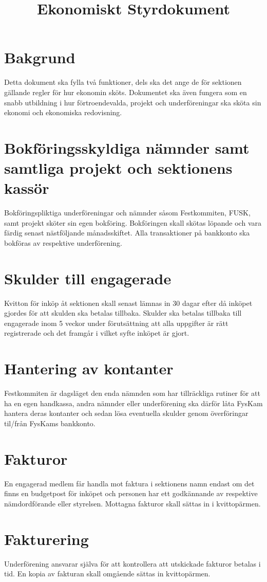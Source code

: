 \documentclass{../resources/dgovdoc}
\title{Ekonomiskt Styrdokument}
\begin{document}
\maketitle

\section{Bakgrund}

Detta dokument ska fylla två funktioner, dels ska det ange de för sektionen gällande regler för hur ekonomin sköts. Dokumentet ska även fungera som en snabb utbildning i hur förtroendevalda, projekt och underföreningar ska sköta sin ekonomi och ekonomiska redovisning. 

\section{Bokföringsskyldiga nämnder samt samtliga projekt och sektionens kassör}

Bokföringspliktiga underföreningar och nämnder såsom Festkommiten, FUSK, samt projekt sköter sin egen bokföring. Bokföringen skall skötas löpande och vara färdig senast nästföljande månadsskiftet. Alla transaktioner på bankkonto ska bokföras av respektive underförening.

\section{Skulder till engagerade}

Kvitton för inköp åt sektionen skall senast lämnas in 30 dagar efter då inköpet gjordes för att skulden ska betalas tillbaka. Skulder ska betalas tillbaka till engagerade inom 5 veckor under förutsättning att alla uppgifter är rätt registrerade och det framgår i vilket syfte inköpet är gjort. 

\section{Hantering av kontanter}

Festkommiten är dagsläget den enda nämnden som har tillräckliga rutiner för att ha en egen handkassa, andra nämnder eller underförening ska därför låta FysKam hantera deras kontanter och sedan lösa eventuella skulder genom överföringar til/från FysKams bankkonto.

\section{Fakturor}

En engagerad medlem får handla mot faktura i sektionens namn endast om det finns en budgetpost för inköpet och personen har ett godkännande av respektive nämdordförande eller styrelsen. Mottagna fakturor skall sättas in i kvittopärmen. 

\section{Fakturering}

Underförening ansvarar själva för att kontrollera att utskickade fakturor betalas i tid. En kopia av fakturan skall omgående sättas in kvittopärmen. 
\end{document}
